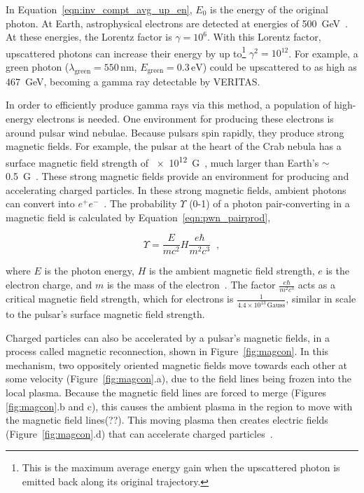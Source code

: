   
  In Equation~\ref{eqn:inv_compt_avg_up_en}, $E_{0}$ is the energy of the original photon.
  At Earth, astrophysical electrons are detected at energies of \SI{500}{GeV}~\cite{500GeVElectrons}.
  At these energies, the Lorentz factor is $\gamma = 10^6$.
  With this Lorentz factor, upscattered photons can increase their energy by up to\footnote{This is the maximum average energy gain when the upscattered photon is emitted back along its original trajectory.} $\gamma^{2} = 10^{12}$.
  For example, a green photon ($\lambda_{\textrm{green}}=550\,\textrm{nm}$, $E_{\textrm{green}}=0.3\,\textrm{eV}$) could be upscattered to as high as \SI{467}{GeV}, becoming a gamma ray detectable by VERITAS.
  
  In order to efficiently produce gamma rays via this method, a population of high-energy electrons is needed.
  One environment for producing these electrons is around pulsar wind nebulae.
  Because pulsars spin rapidly, they produce strong magnetic fields.
  For example, the pulsar at the heart of the Crab nebula has a surface magnetic field strength of \SI{e12}{G}~\cite{pwn_evolution}, much larger than Earth's $\sim$\SI{0.5}{G}~\cite{earth_geomag}.
  These strong magnetic fields provide an environment for producing and accelerating charged particles.
  In these strong magnetic fields, ambient photons can convert into $e^{+}e^{-}$~\cite{pwn_pairprod2,pwn_pairprod3}.
  The probability $\Upsilon$ (0-1) of a photon pair-converting in a magnetic field is calculated by Equation~\ref{eqn:pwn_pairprod},
  
  \begin{equation}\label{eqn:pwn_pairprod}
    \Upsilon = \frac{E}{mc^2} H \frac{e \hbar}{m^2c^3} \;\;,
  \end{equation}
  
  where $E$ is the photon energy, $H$ is the ambient magnetic field strength, $e$ is the electron charge, and $m$ is the mass of the electron~\cite{pwn_pairprod3}.
  The factor $\frac{e \hbar}{m^2c^3}$ acts as a critical magnetic field strength, which for electrons is $\frac{1}{4.4\times10^{13}\,\textrm{Gauss}}$, similar in scale to the pulsar's surface magnetic field strength.
  
  Charged particles can also be accelerated by a pulsar's magnetic fields, in a process called magnetic reconnection, shown in Figure~\ref{fig:magcon}.
  In this mechanism, two oppositely oriented magnetic fields move towards each other at some velocity (Figure~\ref{fig:magcon}.a), due to the field lines being frozen into the local plasma.
  Because the magnetic field lines are forced to merge (Figures \ref{fig:magcon}.b and c), this causes the ambient plasma in the region to move with the magnetic field lines{\color{red}(??)}.
  This moving plasma then creates electric fields (Figure~\ref{fig:magcon}.d) that can accelerate charged particles~\cite{magcon_crab,magcon_schopper,magcon_review,gamma_pwn1,gamma_pwn2}.
  
